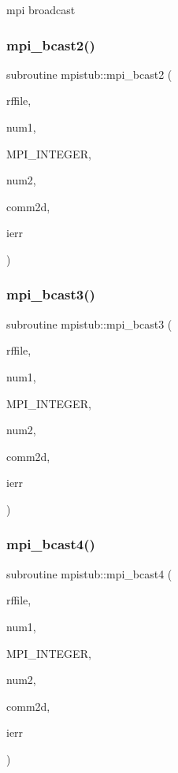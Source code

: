 mpi broadcast 

\mbox{\label{namespacempistub_a0d3b09e89256fef8bc0a4f71f7ff73c0}} 
\subsubsection{\texorpdfstring{mpi\_bcast2()}{mpi\_bcast2()}}
{\footnotesize\ttfamily subroutine mpistub\+::mpi\+\_\+bcast2 (\begin{DoxyParamCaption}\item[{double precision}]{rffile,  }\item[{}]{num1,  }\item[{}]{M\+P\+I\+\_\+\+I\+N\+T\+E\+G\+ER,  }\item[{}]{num2,  }\item[{integer}]{comm2d,  }\item[{}]{ierr }\end{DoxyParamCaption})}

\mbox{\label{namespacempistub_ae8d4cdea848159c537f06677e1d7b712}} 
\subsubsection{\texorpdfstring{mpi\_bcast3()}{mpi\_bcast3()}}
{\footnotesize\ttfamily subroutine mpistub\+::mpi\+\_\+bcast3 (\begin{DoxyParamCaption}\item[{integer, dimension(\+:)}]{rffile,  }\item[{}]{num1,  }\item[{}]{M\+P\+I\+\_\+\+I\+N\+T\+E\+G\+ER,  }\item[{}]{num2,  }\item[{integer}]{comm2d,  }\item[{}]{ierr }\end{DoxyParamCaption})}

\mbox{\label{namespacempistub_abe276f0cf456de80ee888e6b335a4b7d}} 
\subsubsection{\texorpdfstring{mpi\_bcast4()}{mpi\_bcast4()}}
{\footnotesize\ttfamily subroutine mpistub\+::mpi\+\_\+bcast4 (\begin{DoxyParamCaption}\item[{integer}]{rffile,  }\item[{}]{num1,  }\item[{}]{M\+P\+I\+\_\+\+I\+N\+T\+E\+G\+ER,  }\item[{}]{num2,  }\item[{integer}]{comm2d,  }\item[{}]{ierr }\end{DoxyParamCaption})}

